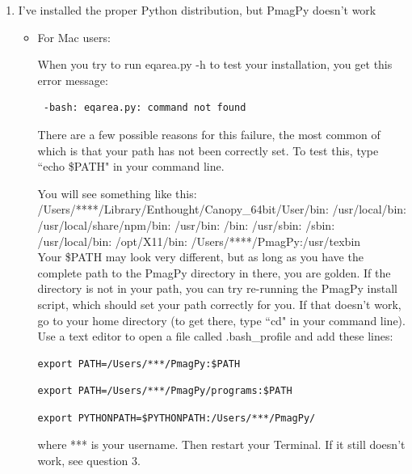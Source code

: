 \documentclass[11pt]{book}
\begin{document}
{{{{\begin{enumerate}
\begin{itemize}
\end{itemize}


\item I've installed the proper Python distribution, but PmagPy doesn't work

\begin{itemize}

\item For Mac users:


When you try to run eqarea.py -h to test your installation, you get this error message:

\begin{verbatim} -bash: eqarea.py: command not found
\end{verbatim}

There are a few possible reasons for this failure, the most common of which is that your path has not been correctly set.  To test this, type ``echo \$PATH" in your command line.

You will see something like this:\\

/Users/****/Library/Enthought/Canopy\_64bit/User/bin: /usr/local/bin: /usr/local/share/npm/bin: /usr/bin: /bin: /usr/sbin: /sbin: /usr/local/bin: /opt/X11/bin: /Users/****/PmagPy:/usr/texbin\\

Your \$PATH may look very different, but as long as you have the complete path to the PmagPy directory in there, you are golden.  If the directory is not in your path, you can try re-running the PmagPy install script, which should set your path correctly  for you.  If that doesn't work, go to your home directory (to get there, type ``cd" in your command line).  Use a text editor to open a file called .bash\_profile and add these lines:

\begin{verbatim}export PATH=/Users/***/PmagPy:$PATH\end{verbatim}
\begin{verbatim}export PATH=/Users/***/PmagPy/programs:$PATH\end{verbatim}
\begin{verbatim}export PYTHONPATH=$PYTHONPATH:/Users/***/PmagPy/\end{verbatim}

where *** is your username.  Then restart your Terminal.  If it still doesn't work, see question 3.



\end{itemize}
\end{enumerate}}}}}
\end{document}
